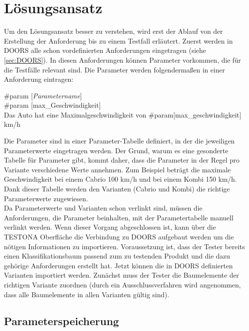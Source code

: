 \chapter{Lösungsansatz}\label{chp:loesungsansatz}

Um  den Lösungsansatz besser zu verstehen, wird erst der Ablauf von der Erstellung der Anforderung bis zu einem Testfall erläutert. Zuerst werden in DOORS alle schon vordefinierten Anforderungen eingetragen (siehe \ref{sec:DOORS}). In diesen Anforderungen können Parameter vorkommen, die für die Testfälle relevant sind. Die Parameter werden folgendermaßen in einer Anforderung eintragen:\\

\begin{center}
\#param [\textit{Parametername}]\\
\#param [max\_Geschwindigkeit]\\
Das Auto hat eine Maximalgeschwindigkeit von \#param[max\_geschwindigkeit] km/h
\end{center}

Die Parameter sind in einer Parameter-Tabelle definiert, in der die jeweiligen Parameterwerte eingetragen werden. Der Grund, warum es eine gesonderte Tabelle für Parameter gibt, kommt daher, dass die Parameter in der Regel pro Variante verschiedene Werte annehmen. Zum Beispiel beträgt die maximale Geschwindigkeit bei einem Cabrio 100 km/h  und bei einem Kombi 150 km/h. Dank dieser Tabelle werden den Varianten (Cabrio und Kombi) die richtige Parameterwerte zugewiesen.\\

Da Parameterwerte und Varianten schon verlinkt sind, müssen die Anforderungen, die Parameter beinhalten, mit der Parametertabelle manuell verlinkt werden. Wenn dieser Vorgang abgeschlossen ist, kann über die TESTONA Oberfläche die Verbindung zu DOORS aufgebaut werden um die nötigen Informationen zu importieren. Voraussetzung ist, dass der Tester bereits einen Klassifikationsbaum passend zum zu testenden Produkt und die dazu gehörige Anforderungen erstellt hat. Jetzt können die in DOORS definierten Varianten importiert werden. Zunächst muss der Tester die Baumelemente der richtigen Variante zuordnen (durch ein Ausschlussverfahren wird angenommen, dass alle Baumelemente in allen Varianten gültig sind). 


\newpage
\section{Parameterspeicherung}\label{sec.parameterspeicherung}
